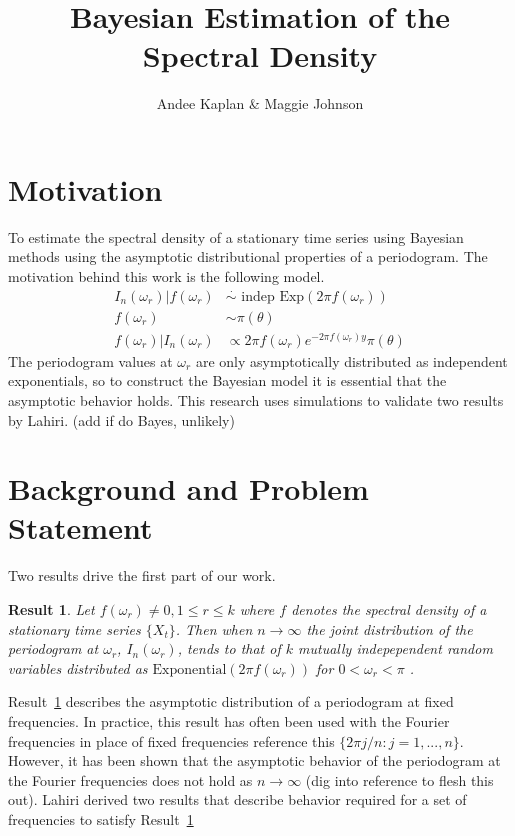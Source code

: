 \documentclass{article}\usepackage[]{graphicx}\usepackage[]{color}
\title{Bayesian Estimation of the Spectral Density}
\author{Andee Kaplan \& Maggie Johnson}
\newcommand{\mj}[1]{{\color{blue} #1}}
\theoremstyle{plain}
\newtheorem{res}{Result}
\begin{document}
\maketitle



\section{Motivation}

To estimate the spectral density of a stationary time series using Bayesian methods using the asymptotic distributional properties of a periodogram. The motivation behind this work is the following model.
\begin{align*}
I_n(\omega_r) |f(\omega_r) &\stackrel{\cdot}{\sim}\text{ indep } \text{Exp}(2\pi f(\omega_r)) \\
f(\omega_r) & \sim \pi(\theta)\\
f(\omega_r) | I_n(\omega_r) &\propto 2\pi f(\omega_r) e^{-2\pi f(\omega_r) y} \pi(\theta)
\end{align*}
The periodogram values at $\omega_r$ are only asymptotically distributed as independent exponentials, so to construct the Bayesian model it is essential that the asymptotic behavior holds. This research uses simulations to \mj{validate} two results by Lahiri. \cite{lahiri2003necessary} \mj{(add if do Bayes, unlikely)}


\section{Background and Problem Statement}

Two results drive the first part of our work.

\begin{res} \label{res:first}
Let $f(\omega_r) \not= 0, 1 \le r \le k$ where $f$ denotes the spectral density of a stationary time series $\{X_t\}$. Then when $n\rightarrow \infty$ the joint distribution of the periodogram at $\omega_r$, $I_n(\omega_r)$, tends to that of $k$ mutually indepependent random variables distributed as $\text{Exponential}(2\pi f(\omega_r))$ for $0<\omega_r<\pi$ \cite{brockwell2002introduction}.
\end{res}

Result~\ref{res:first} describes the asymptotic distribution of a periodogram at fixed frequencies. In practice, this result has often been used with the Fourier frequencies in place of fixed frequencies \mj{reference this} $\{2\pi j/n : j=1,...,n\}$. However, it has been shown that the asymptotic behavior of the periodogram at the Fourier frequencies does not hold as $n \rightarrow \infty$ \mj{(dig into reference to flesh this out)}. Lahiri \cite{lahiri2003necessary} derived two results that describe behavior required for a set of frequencies to satisfy Result~\ref{res:first}
\end{document}

